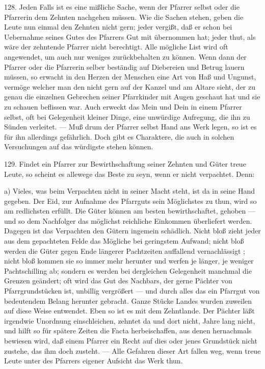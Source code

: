 128. Jeden Falls ist es eine mißliche Sache, wenn der Pfarrer selbst oder die Pfarrerin dem Zehnten nachgehen müssen. Wie die Sachen stehen, geben die Leute nun einmal den Zehnten nicht gern; jeder vergißt, daß er schon bei Uebernahme seines Gutes des Pfarrers Gut mit übernommen hat; jeder thut, als wäre der zehntende
Pfarrer nicht berechtigt. Alle mögliche List wird oft angewendet, um auch nur weniges zurückbehalten zu können. Wenn dann der Pfarrer oder die Pfarrerin selber beständig auf Diebereien und Betrug lauern müssen, so erwacht in den Herzen der Menschen eine Art von Haß und Ungunst, vermöge welcher man den nicht gern auf der Kanzel und am Altare sieht, der zu genau die einzelnen Gebrechen seiner Pfarrkinder mit Augen geschaut hat und sie zu schauen beflissen war. Auch erweckt das Mein und Dein in einem Pfarrer selbst, oft bei Gelegenheit kleiner Dinge, eine unwürdige Aufregung, die ihn zu Sünden verleitet. — Muß drum der Pfarrer selbst Hand ans Werk legen, so ist es für ihn allerdings gefährlich. Doch gibt es Charaktere, die auch in solchen Versuchungen auf das würdigste stehen können.

129. Findet ein Pfarrer zur Bewirthschaftung seiner Zehnten und Güter treue Leute, so scheint es allewege das Beste zu seyn, wenn er nicht verpachtet. Denn:

a) Vieles, was beim Verpachten nicht in seiner Macht steht, ist da in seine Hand gegeben. Der Eid, zur Aufnahme des Pfarrguts sein Möglichstes zu thun, wird so am redlichsten erfüllt. Die Güter können am besten bewirthschaftet, gehoben — und so dem Nachfolger das möglichst reichliche Einkommen überliefert werden. Dagegen ist das Verpachten den Gütern ingemein schädlich. Nicht bloß zieht jeder aus dem gepachteten Felde das Mögliche bei geringstem Aufwand; nicht bloß werden die Güter gegen Ende längerer Pachtzeiten auffallend vernachlässigt
; nicht bloß kommen sie so immer mehr herunter und werfen je länger, je weniger Pachtschilling ab; sondern es werden bei dergleichen Gelegenheit manchmal die Grenzen geändert; oft wird das Gut des Nachbars, der gerne Pächter von Pfarrgrundstücken ist, unbillig vergrößert — und durch alles das ein Pfarrgut von bedeutendem Belang herunter gebracht. Ganze Stücke Landes wurden zuweilen auf diese Weise entwendet. Eben so ist es mit dem Zehntlande. Der Pächter läßt irgendwie Unordnung einschleichen, zehntet da und dort nicht, Jahre lang nicht, und hilft so für spätere Zeiten die Facta herbeischaffen, aus denen hernachmals bewiesen wird, daß einem Pfarrer ein Recht auf dies oder jenes Grundstück nicht zustehe, das ihm doch zusteht. — Alle Gefahren dieser Art fallen weg, wenn treue Leute unter des Pfarrers eigener Aufsicht das Werk thun.

